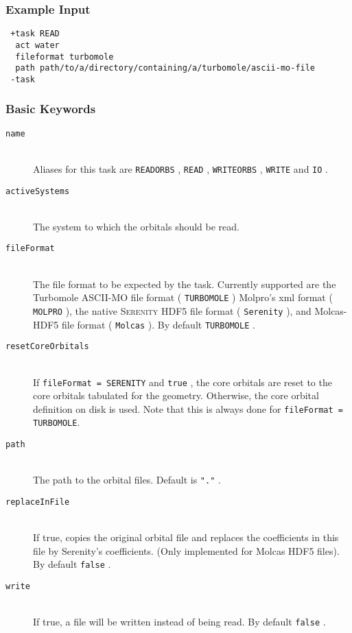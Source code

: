\documentclass[bibliography=totocnumbered,a4paper,10pt,oneside]{scrbook}
\newcommand{\ttt}[1]{%
  \begingroup\setlength{\fboxsep}{1pt}%
  \colorbox{serenity-green!30}{\texttt{\hspace*{2pt}\vphantom{(g}#1\hspace*{2pt}}}%
  \endgroup
}
\begin{document}
\subsubsection{Example Input}
\begin{lstlisting}
 +task READ
  act water
  fileformat turbomole
  path path/to/a/directory/containing/a/turbomole/ascii-mo-file
 -task
\end{lstlisting}

\subsubsection{Basic Keywords}
\begin{description}
 \item [\texttt{name}]\hfill \\
  Aliases for this task are \ttt{READORBS}, \ttt{READ}, \ttt{WRITEORBS}, \ttt{WRITE} and \ttt{IO}.
 \item [\texttt{activeSystems}]\hfill \\
  The system to which the orbitals should be read.
 \item [\texttt{fileFormat}]\hfill \\
  The file format to be expected by the task. Currently supported are the Turbomole ASCII-MO file format (\ttt{TURBOMOLE})
  Molpro's xml format (\ttt{MOLPRO}), the native \textsc{Serenity} HDF5 file format (\ttt{Serenity}), and Molcas-HDF5 file
  format (\ttt{Molcas}). By default \ttt{TURBOMOLE}.
 \item [\texttt{resetCoreOrbitals}]\hfill \\
  If \texttt{fileFormat = SERENITY} and \ttt{true}, the core orbitals are reset to the core orbitals tabulated for the geometry. Otherwise, the core orbital
  definition on disk is used. Note that this is always done for \texttt{fileFormat = TURBOMOLE}.
 \item [\texttt{path}]\hfill \\
  The path to the orbital files. Default is \ttt{"."}.
 \item [\texttt{replaceInFile}]\hfill \\
  If true, copies the original orbital file and replaces the coefficients in this file by Serenity's coefficients. (Only implemented for Molcas HDF5 files).
  By default \ttt{false}.
 \item [\texttt{write}]\hfill \\
  If true, a file will be written instead of being read. By default \ttt{false}.
\end{description}
\end{document}
